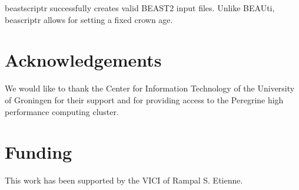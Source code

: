 \documentclass{bioinfo}
\begin{document}
beastscriptr successfully creates valid BEAST2 input files. Unlike BEAUti,
beascriptr allows for setting a fixed crown age.

\section*{Acknowledgements}

We would like to thank the Center for Information Technology of the University of Groningen for their support
and for providing access to the Peregrine high performance computing cluster.

\section*{Funding}

This work has been supported by the VICI of Rampal S. Etienne.


%
%
%
%
%

%



\begin{thebibliography}{}

\end{thebibliography}
\end{document}
